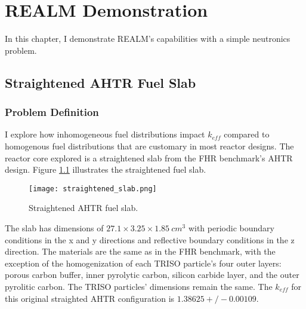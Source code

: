 \chapter{REALM Demonstration}
In this chapter, I demonstrate \gls{REALM}'s capabilities with a simple neutronics 
problem. 

\section{Straightened AHTR Fuel Slab}
\subsection{Problem Definition}
I explore how inhomogeneous fuel distributions impact $k_{eff}$ compared to 
homogenous fuel distributions that are customary in most reactor designs. 
The reactor core explored is a straightened slab from the \gls{FHR} benchmark's
\gls{AHTR} design.
Figure \ref{fig:straightened_slab} illustrates the straightened fuel slab. 
\begin{figure}[]
    \centering
    \texttt{[image: straightened\_slab.png]}
    \raggedright
    \caption{Straightened \acrfull{AHTR} fuel slab.}
    \label{fig:straightened_slab}
\end{figure}
The slab has dimensions of $27.1 \times 3.25 \times 1.85\ cm^3$
with periodic boundary conditions in the x and y directions and reflective 
boundary conditions in the z direction. 
The materials are the same as in the \gls{FHR} benchmark, with the exception 
of the homogenization of each \gls{TRISO} particle's four outer layers: 
porous carbon buffer, inner pyrolytic carbon, silicon carbide layer, and the 
outer pyrolitic carbon. 
The \gls{TRISO} particles' dimensions remain the same.
The $k_{eff}$ for this original straighted \gls{AHTR} configuration is 
$1.38625 +/- 0.00109$. 

